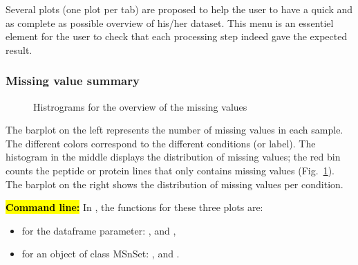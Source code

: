 \documentclass[12pt]{article}
\begin{document}
Several plots (one plot per tab) are proposed to help the user to have a quick and as complete as possible overview of his/her dataset. This menu is an essentiel element for the user to check that each processing step indeed  gave the expected result.


\subsubsection{Missing value summary}


\begin {figure}
\centering
{}
\caption{Histrograms for the overview of the missing values}\label{fig:sdmv}
\end {figure}

The barplot on the left represents the number of missing values in each sample. The different colors correspond to the different conditions (or label).
The histogram in the middle displays the distribution of missing values; the red bin counts the peptide or protein lines that only contains missing values (Fig.~\ref{fig:sdmv}).
{The barplot on the right shows the distribution of missing values per condition.}

\hl{\bf Command line:} In , the functions for these three plots are:
\begin{itemize}
\item for the dataframe parameter: ,  and ,
\item for an object of class MSnSet: ,  and .
\end{itemize}
\end{document}
